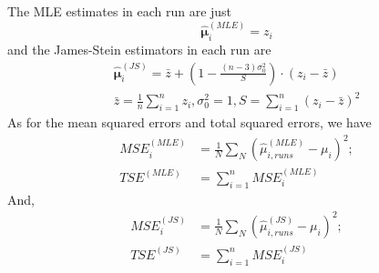 \documentclass{article}
\begin{document}
The MLE estimates in each run are just
\begin{displaymath}
\hat{\bm{\mu}}^{(MLE)}_i = z_i
\end{displaymath}
and the James-Stein estimators in each run are
\begin{displaymath}
\begin{split}
\hat{\bm{\mu}}^{(JS)}_i = \bar{z} + (1-\frac{(n-3)\sigma_0^2}{S})\cdot (z_i - \bar{z}) \\
\bar{z} = \frac{1}{n} \sum_{i=1}^n z_i,
\sigma_0^2 = 1,
S = \sum_{i=1}^n (z_i - \bar{z})^2
\end{split}
\end{displaymath}
As for the mean squared errors and total squared errors, we have
\begin{displaymath}
\begin{split}
MSE_i^{(MLE)} &= \frac{1}{N} \sum_N (\hat{\mu}_{i,runs}^{(MLE)} - \mu_i)^2; \\
TSE^{(MLE)} &= \sum_{i=1}^n MSE_i^{(MLE)}
\end{split}
\end{displaymath}
And,
\begin{displaymath}
\begin{split}
MSE_i^{(JS)} &= \frac{1}{N} \sum_N (\hat{\mu}_{i,runs}^{(JS)} - \mu_i)^2; \\
TSE^{(JS)} &= \sum_{i=1}^n MSE_i^{(JS)}\\
\end{split}
\end{displaymath}

\end{document}
